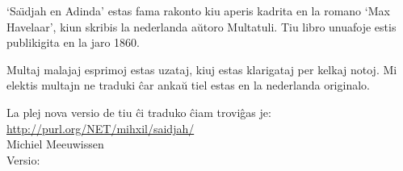 \begin{minipage}[t]{\textwidth}
`Sa\"{\i}djah en Adinda' estas fama rakonto kiu aperis kadrita
en la romano `Max Havelaar', kiun skribis la nederlanda aŭtoro
Multatuli. Tiu libro  unuafoje estis publikigita en la jaro 1860.

Multaj malajaj esprimoj estas uzataj, kiuj estas klarigataj per
kelkaj notoj. Mi elektis multajn ne traduki ĉar
ankaŭ tiel estas en la nederlanda originalo.

La plej nova versio de tiu ĉi traduko ĉiam troviĝas je:\\
\href{http://purl.org/NET/mihxil/saidjah/}{http://purl.org/NET/mihxil/saidjah/}\\

Michiel  Meeuwissen \\

Versio: \href{https://github.com/mihxil/saidjah}{}
\end{minipage}
